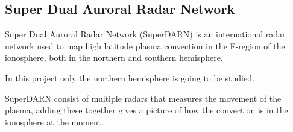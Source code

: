\subsection{Super Dual Auroral Radar Network}

Super Dual Auroral Radar Network (SuperDARN) is an international radar network used to map high latitude plasma convection in the F-region of the ionosphere, both in the northern and southern hemisphere.

In this project only the northern hemisphere is going to be studied. 

SuperDARN consist of multiple radars that measures the movement of the plasma, adding these together gives a picture of how the convection is in the ionosphere at the moment. 